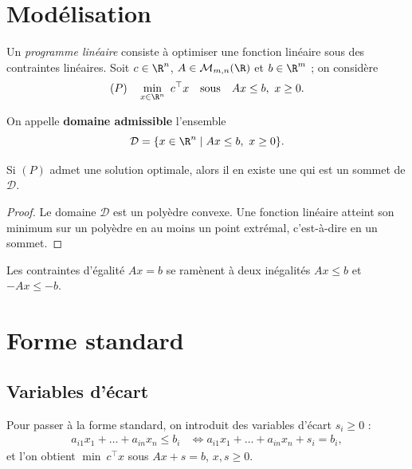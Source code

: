 \section{Modélisation}

Un \emph{programme linéaire} consiste à optimiser une fonction linéaire sous des contraintes linéaires. Soit $c\in\R^n$, $A\in\mathcal{M}_{m,n}(\R)$ et $b\in\R^m$ ; on considère
\[
  (P)\quad \min_{x\in\R^n}\ c^\top x \quad\text{sous}\quad Ax\le b,\ x\ge 0 .
\]

\begin{definition}
On appelle \textbf{domaine admissible} l'ensemble
$$\mathcal{D}=\{x\in\R^n \mid Ax\le b,\ x\ge 0\}.$$
\end{definition}

\begin{theoreme}
Si $(P)$ admet une solution optimale, alors il en existe une qui est un sommet de $\mathcal{D}$.
\end{theoreme}

\begin{proof}
Le domaine $\mathcal{D}$ est un polyèdre convexe. Une fonction linéaire atteint son minimum sur un polyèdre en au moins un point extrémal, c'est-à-dire en un sommet.
\end{proof}

\begin{remarque}
Les contraintes d'égalité $Ax=b$ se ramènent à deux inégalités $Ax\le b$ et $-Ax\le -b$.
\end{remarque}

\section{Forme standard}

\subsection{Variables d'écart}

Pour passer à la forme standard, on introduit des variables d'écart $s_i\ge 0$ :
\begin{align*}
  a_{i1}x_1+\dots+a_{in}x_n \le b_i
  &\iff a_{i1}x_1+\dots+a_{in}x_n + s_i = b_i,
\end{align*}
et l'on obtient $\min\ c^\top x$ sous $Ax+s=b$, $x,s\ge 0$.

